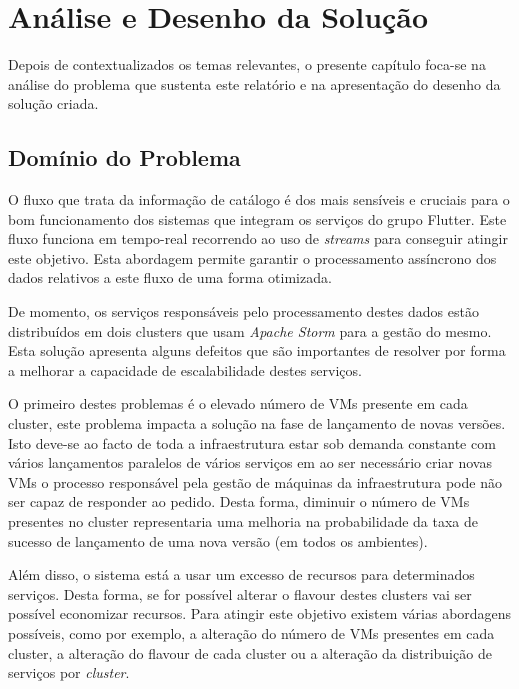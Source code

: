 \chapter{Análise e Desenho da Solução}
\label{sec:3-Analise}

Depois de contextualizados os temas relevantes, o presente capítulo foca-se na análise do problema 
que sustenta este relatório e na apresentação do desenho da solução criada.

\section{Domínio do Problema}

O fluxo que trata da informação de catálogo é dos mais sensíveis e cruciais para o bom funcionamento
dos sistemas que integram os serviços do grupo Flutter. Este fluxo funciona em tempo-real recorrendo
ao uso de \textit{streams} para conseguir atingir este objetivo. Esta abordagem permite garantir
o processamento assíncrono dos dados relativos a este fluxo de uma forma otimizada.

De momento, os serviços responsáveis pelo processamento destes dados estão distribuídos em dois
\glspl{cluster} que usam \textit{Apache Storm} para a gestão do mesmo. Esta solução apresenta alguns
defeitos que são importantes de resolver por forma a melhorar a capacidade de escalabilidade destes
serviços. 

O primeiro destes problemas é o elevado número de \acp{VM} presente em cada \gls{cluster},
este problema impacta a solução na fase de lançamento de novas versões. Isto deve-se ao facto de
toda a infraestrutura estar sob demanda constante com vários lançamentos paralelos de vários serviços
em ao ser necessário criar novas \acp{VM} o processo responsável pela gestão de máquinas da
infraestrutura pode não ser capaz de responder ao pedido. Desta forma, diminuir o número de \acp{VM}
presentes no \gls{cluster} representaria uma melhoria na probabilidade da taxa de sucesso de
lançamento de uma nova versão (em todos os ambientes).

Além disso, o sistema está a usar um excesso de recursos para determinados serviços. Desta forma,
se for possível alterar o \gls{flavour} destes \glspl{cluster} vai ser possível economizar
recursos. Para atingir este objetivo existem várias abordagens possíveis, como por exemplo, a
alteração do número de \acp{VM} presentes em cada \gls{cluster}, a alteração do \gls{flavour}
de cada \gls{cluster} ou a alteração da distribuição de serviços por \textit{\gls{cluster}}.


